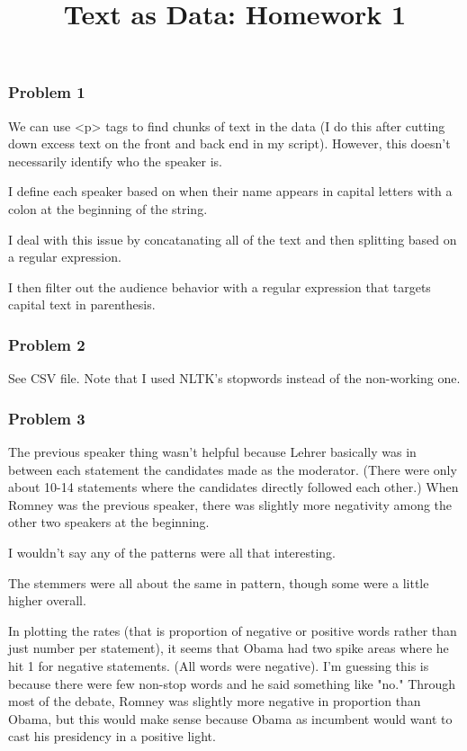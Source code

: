 \documentclass[12pt,letterpaper]{article}
\title{Text as Data: Homework 1}
\date{}
\begin{document}

\maketitle

\subsubsection*{Problem 1}

We can use <p> tags to find chunks of text in the data (I do this after cutting down excess text on the front and back end in my script). However, this doesn't necessarily identify who the speaker is. 

I define each speaker based on when their name appears in capital letters with a colon at the beginning of the string. 

I deal with this issue by concatanating all of the text and then splitting based on a regular expression.

I then filter out the audience behavior with a regular expression that targets capital text in parenthesis.

\subsubsection*{Problem 2}

See CSV file. Note that I used NLTK's stopwords instead of the non-working one. 

\subsubsection*{Problem 3}

The previous speaker thing wasn't helpful because Lehrer basically was in between each statement the candidates made as the moderator. (There were only about 10-14 statements where the candidates directly followed each other.) When Romney was the previous speaker, there was slightly more negativity among the other two speakers at the beginning.

I wouldn't say any of the patterns were all that interesting.

The stemmers were all about the same in pattern, though some were a little higher overall.

In plotting the rates (that is proportion of negative or positive words rather than just number per statement), it seems that Obama had two spike areas where he hit 1 for negative statements. (All words were negative). I'm guessing this is because there were few non-stop words and he said something like "no." Through most of the debate, Romney was slightly more negative in proportion than Obama, but this would make sense because Obama as incumbent would want to cast his presidency in a positive light. 
\end{document}
